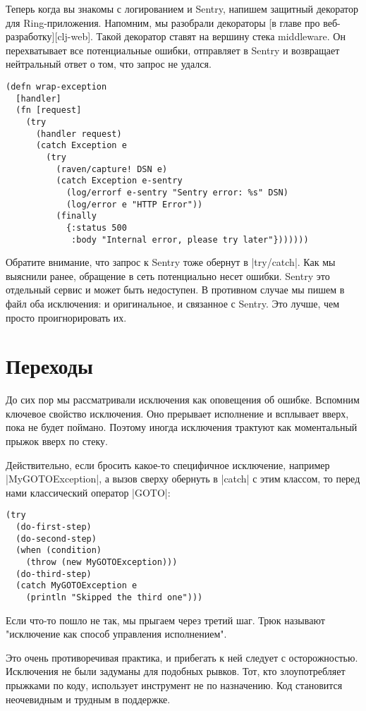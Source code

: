 Теперь когда вы знакомы с логированием и Sentry, напишем защитный декоратор для
Ring-приложения. Напомним, мы разобрали декораторы [в главе про
веб-разработку][clj-web]. Такой декоратор ставят на вершину стека middleware. Он
перехватывает все потенциальные ошибки, отправляет в Sentry и возвращает
нейтральный ответ о том, что запрос не удался.

\begin{verbatim}
(defn wrap-exception
  [handler]
  (fn [request]
    (try
      (handler request)
      (catch Exception e
        (try
          (raven/capture! DSN e)
          (catch Exception e-sentry
            (log/errorf e-sentry "Sentry error: %s" DSN)
            (log/error e "HTTP Error"))
          (finally
            {:status 500
             :body "Internal error, please try later"}))))))
\end{verbatim}

Обратите внимание, что запрос к Sentry тоже обернут в \spverb|try/catch|. Как мы
выяснили ранее, обращение в сеть потенциально несет ошибки. Sentry это отдельный
сервис и может быть недоступен. В противном случае мы пишем в файл оба
исключения: и оригинальное, и связанное с Sentry. Это лучше, чем просто
проигнорировать их.

\section{Переходы}

До сих пор мы рассматривали исключения как оповещения об ошибке. Вспомним
ключевое свойство исключения. Оно прерывает исполнение и всплывает вверх, пока
не будет поймано. Поэтому иногда исключения трактуют как моментальный прыжок
вверх по стеку.

Действительно, если бросить какое-то специфичное исключение, например
\spverb|MyGOTOException|, а вызов сверху обернуть в \spverb|catch| с этим классом, то перед
нами классический оператор \spverb|GOTO|:

\begin{verbatim}
(try
  (do-first-step)
  (do-second-step)
  (when (condition)
    (throw (new MyGOTOException)))
  (do-third-step)
  (catch MyGOTOException e
    (println "Skipped the third one")))
\end{verbatim}

Если что-то пошло не так, мы прыгаем через третий шаг. Трюк называют "исключение
как способ управления исполнением".

Это очень противоречивая практика, и прибегать к ней следует с
осторожностью. Исключения не были задуманы для подобных рывков. Тот, кто
злоупотребляет прыжками по коду, использует инструмент не по назначению. Код
становится неочевидным и трудным в поддержке.

